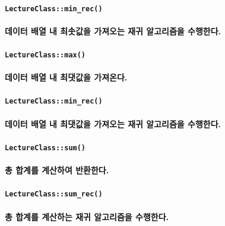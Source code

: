 \documentclass[UTF8]{report}
\begin{document}
            \paragraph{\texttt{LectureClass::min\_rec()}}
            \paragraph{%
                \normalfont 데이터 배열 내 최솟값을 가져오는 재귀 알고리즘을 수행한다.
            }

            \paragraph{\texttt{LectureClass::max()}}
            \paragraph{%
                \normalfont 데이터 배열 내 최댓값을 가져온다.
            }

            \paragraph{\texttt{LectureClass::min\_rec()}}
            \paragraph{%
                \normalfont 데이터 배열 내 최댓값을 가져오는 재귀 알고리즘을 수행한다.
            }

            \paragraph{\texttt{LectureClass::sum()}}
            \paragraph{%
                \normalfont 총 합계를 계산하여 반환한다.
            }

            \paragraph{\texttt{LectureClass::sum\_rec()}}
            \paragraph{%
                \normalfont 총 합계를 계산하는 재귀 알고리즘을 수행한다.
            }
\end{document}
